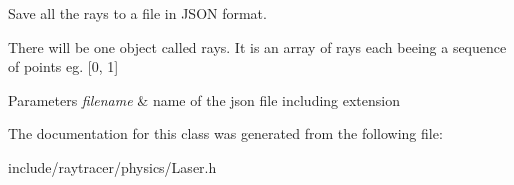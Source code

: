 Save all the rays to a file in J\+S\+ON format. 

There will be one object called rays. It is an array of rays each beeing a sequence of points eg. \mbox{[}0, 1\mbox{]} 
\begin{DoxyParams}{Parameters}
{\em filename} & name of the json file including extension \\
\hline
\end{DoxyParams}


The documentation for this class was generated from the following file\+:\begin{DoxyCompactItemize}
\item 
include/raytracer/physics/Laser.\+h\end{DoxyCompactItemize}
